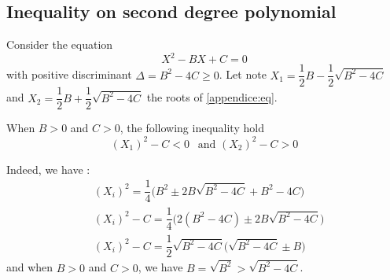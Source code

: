 \documentclass{article}
\begin{document}
\begin{appendices}
\section{Inequality on second degree polynomial \label{appendice:ineq2nd}}

Consider the equation
\begin{equation}
X^2 - B X + C = 0
\label{appendice:eq}
\end{equation}
with positive discriminant $\Delta = B^2 - 4C \geq 0$. Let note $X_{1} = \dfrac{1}{2}B - \dfrac{1}{2} \sqrt{B^2 - 4 C}$ and $X_2 = \dfrac{1}{2}B + \dfrac{1}{2} \sqrt{B^2 - 4 C}$  the roots of \eqref{appendice:eq}.

When $B > 0$ and $C >0$, the following inequality hold
\begin{equation}
(X_1) ^ 2 - C < 0 \:\:\text{ and } (X_2)^2 - C > 0
\end{equation}

Indeed, we have :
\begin{subequations}
\begin{align}
&(X_i) ^2 = \dfrac{1}{4} \Big(B^2 \pm 2 B\sqrt{B^2 - 4C} + B^2 - 4C \Big) \\
&(X_i)^2 - C = \dfrac{1}{4} \Big(2(B^2 - 4C) \pm 2B \sqrt{B^2 - 4C} \Big) \\
&(X_i)^2 - C = \dfrac{1}{2} \sqrt{B^2 - 4C} \Big( \sqrt{B^2 - 4C} \pm B \Big)
\end{align}
\end{subequations}
and when $B > 0$ and $C>0$, we have $B = \sqrt{B^2} > \sqrt{B^2 - 4C}$.




\end{appendices}



\end{document}
